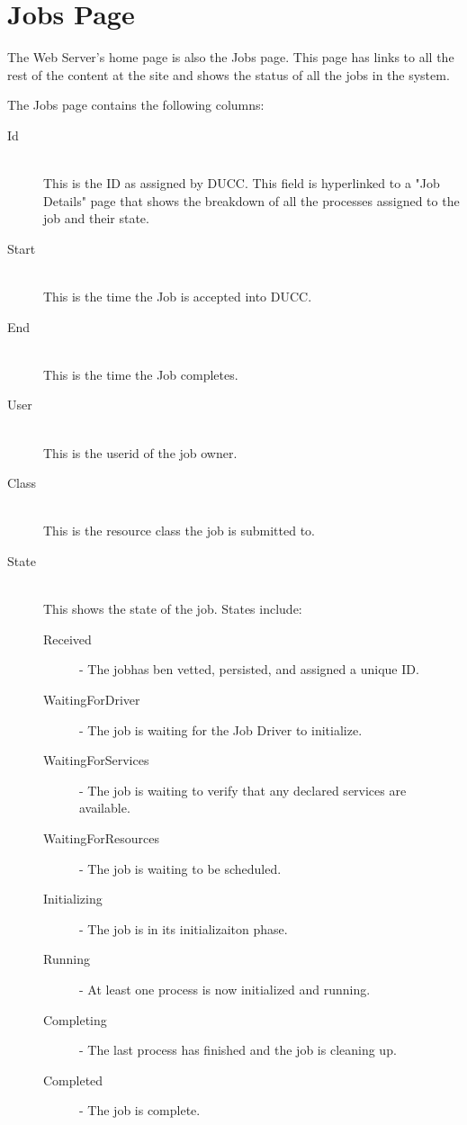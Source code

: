 
    \section{Jobs Page}
        The Web Server's home page is also the Jobs page. This page has links to all the rest of the content 
        at the site and shows the status of all the jobs in the system. 
    
        The Jobs page contains the following columns: 

        \begin{description}

            \item[Id] \hfill \\
              This is the ID as assigned by DUCC. This field is hyperlinked to a "Job Details" page
              that shows the breakdown of all the processes assigned to the job and their state.
              
            \item[Start] \hfill \\
              This is the time the Job is accepted into DUCC.
              
            \item[End] \hfill \\
              This is the time the Job completes.
              
            \item[User] \hfill \\
              This is the userid of the job owner.
              
            \item[Class] \hfill \\
              This is the resource class the job is submitted to.
              
            \item[State] \hfill \\
              This shows the state of the job. States include:
              \begin{description}
                  \item[Received] - The jobhas ben vetted, persisted, and assigned a unique ID. 
                  \item[WaitingForDriver] - The job is waiting for the Job Driver to initialize. 
                  \item[WaitingForServices] - The job is waiting to verify that any declared services are available. 
                  \item[WaitingForResources] - The job is waiting to be scheduled. 
                  \item[Initializing] - The job is in its initializaiton phase. 
                  \item[Running] - At least one process is now initialized and running. 
                  \item[Completing] - The last process has finished and the job is cleaning up. 
                  \item[Completed] - The job is complete. 
              \end{description}
                  

\end{description}
